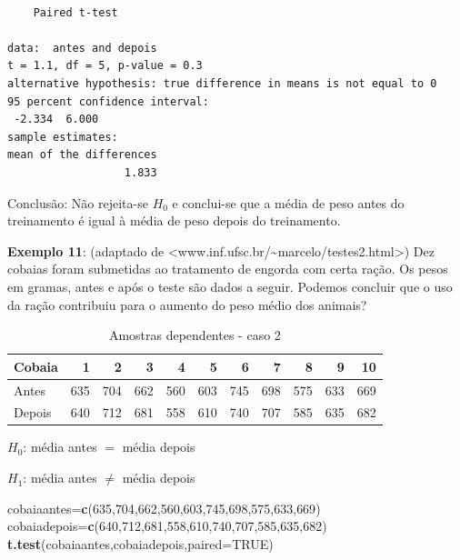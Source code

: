 \documentclass[12pt,brazil,oneside]{book}
\newenvironment{Shaded}{\begin{snugshade}}{\end{snugshade}}
\newcommand{\DataTypeTok}[1]{\textcolor[rgb]{0.13,0.29,0.53}{#1}}
\newcommand{\DecValTok}[1]{\textcolor[rgb]{0.00,0.00,0.81}{#1}}
\newcommand{\KeywordTok}[1]{\textcolor[rgb]{0.13,0.29,0.53}{\textbf{#1}}}
\newcommand{\NormalTok}[1]{#1}
\newcommand{\OtherTok}[1]{\textcolor[rgb]{0.56,0.35,0.01}{#1}}
\begin{document}
\begin{verbatim}

    Paired t-test

data:  antes and depois
t = 1.1, df = 5, p-value = 0.3
alternative hypothesis: true difference in means is not equal to 0
95 percent confidence interval:
 -2.334  6.000
sample estimates:
mean of the differences 
                  1.833 
\end{verbatim}

Conclusão: Não rejeita-se \(H_0\) e conclui-se que a média de peso antes do treinamento é igual à média de peso depois do treinamento.

\textbf{Exemplo 11}: (adaptado de \textless{}www.inf.ufsc.br/\textasciitilde{}marcelo/testes2.html\textgreater{}) Dez cobaias foram submetidas ao tratamento de engorda com certa ração. Os pesos em gramas, antes e após o teste são dados a seguir. Podemos concluir que o uso da ração contribuiu para o aumento do peso médio dos animais?

\begin{table}

\caption{\label{tab:unnamed-chunk-111}Amostras dependentes - caso 2}
\centering
\begin{tabular}[t]{l|r|r|r|r|r|r|r|r|r|r}
\hline
Cobaia & 1 & 2 & 3 & 4 & 5 & 6 & 7 & 8 & 9 & 10\\
\hline
Antes & 635 & 704 & 662 & 560 & 603 & 745 & 698 & 575 & 633 & 669\\
\hline
Depois & 640 & 712 & 681 & 558 & 610 & 740 & 707 & 585 & 635 & 682\\
\hline
\end{tabular}
\end{table}

\textbf{\(H_0\)}: média antes \(=\) média depois

\textbf{\(H_1\)}: média antes \(\neq\) média depois

\begin{Shaded}
\begin{Highlighting}[]
\NormalTok{cobaiaantes=}\KeywordTok{c}\NormalTok{(}\DecValTok{635}\NormalTok{,}\DecValTok{704}\NormalTok{,}\DecValTok{662}\NormalTok{,}\DecValTok{560}\NormalTok{,}\DecValTok{603}\NormalTok{,}\DecValTok{745}\NormalTok{,}\DecValTok{698}\NormalTok{,}\DecValTok{575}\NormalTok{,}\DecValTok{633}\NormalTok{,}\DecValTok{669}\NormalTok{)}
\NormalTok{cobaiadepois=}\KeywordTok{c}\NormalTok{(}\DecValTok{640}\NormalTok{,}\DecValTok{712}\NormalTok{,}\DecValTok{681}\NormalTok{,}\DecValTok{558}\NormalTok{,}\DecValTok{610}\NormalTok{,}\DecValTok{740}\NormalTok{,}\DecValTok{707}\NormalTok{,}\DecValTok{585}\NormalTok{,}\DecValTok{635}\NormalTok{,}\DecValTok{682}\NormalTok{)}
\KeywordTok{t.test}\NormalTok{(cobaiaantes,cobaiadepois,}\DataTypeTok{paired=}\OtherTok{TRUE}\NormalTok{)}
\end{Highlighting}
\end{Shaded}
\end{document}
